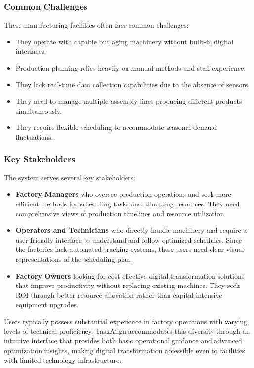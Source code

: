 \subsubsection{Common Challenges}
These manufacturing facilities often face common challenges:
\begin{itemize}
    \item They operate with capable but aging machinery without built-in digital interfaces.
    \item Production planning relies heavily on manual methods and staff experience.
    \item They lack real-time data collection capabilities due to the absence of sensors.
    \item They need to manage multiple assembly lines producing different products simultaneously.
    \item They require flexible scheduling to accommodate seasonal demand fluctuations.
\end{itemize}

\subsubsection{Key Stakeholders}
The system serves several key stakeholders:
\begin{itemize}
    \item \textbf{Factory Managers} who oversee production operations and seek more efficient methods for scheduling tasks and allocating resources. They need comprehensive views of production timelines and resource utilization.
    \item \textbf{Operators and Technicians} who directly handle machinery and require a user-friendly interface to understand and follow optimized schedules. Since the factories lack automated tracking systems, these users need clear visual representations of the scheduling plan.
    \item \textbf{Factory Owners} looking for cost-effective digital transformation solutions that improve productivity without replacing existing machines. They seek ROI through better resource allocation rather than capital-intensive equipment upgrades.
\end{itemize}

Users typically possess substantial experience in factory operations with varying levels of technical proficiency. TaskAlign accommodates this diversity through an intuitive interface that provides both basic operational guidance and advanced optimization insights, making digital transformation accessible even to facilities with limited technology infrastructure.


